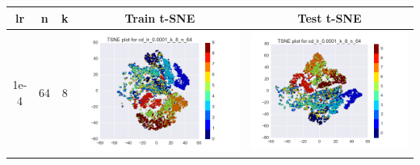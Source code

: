 \documentclass[12pt]{report}
\begin{document}
\begin{table}[H]
  \centering
  \begin{tabular}{ | c | c | c | c || c |}
    \hline
    \textbf{lr} & \textbf{n} & \textbf{k} & \textbf{Train t-SNE} & \textbf{Test t-SNE} \\ \hline
    1e-4 & 64 & 8 &
    \begin{minipage}{.3\textwidth}
      \includegraphics[scale=0.25]{cd_lr_0_0001_k_8_n_64.png}
    \end{minipage} &
    \begin{minipage}{.3\textwidth}
      \includegraphics[scale=0.25]{test_cd_lr_0_0001_k_8_n_64.png}
    \end{minipage}

\end{tabular}
\end{table}
\end{document}
